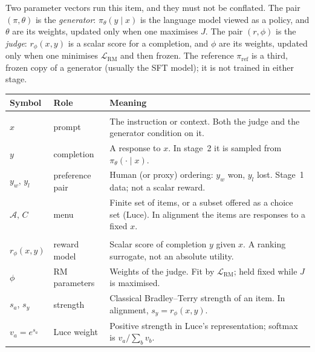 \documentclass[11pt,a4paper]{article}
\theoremstyle{definition}
\begin{document}
Two parameter vectors run this item, and they must not be conflated. The pair \((\pi,\theta)\) is the \emph{generator}: \(\pi_\theta(y\mid x)\) is the language model viewed as a policy, and \(\theta\) are its weights, updated only when one maximises \(J\). The pair \((r,\phi)\) is the \emph{judge}: \(r_\phi(x,y)\) is a scalar score for a completion, and \(\phi\) are its weights, updated only when one minimises \(\mathcal{L}_{\mathrm{RM}}\) and then frozen. The reference \(\pi_{\mathrm{ref}}\) is a third, frozen copy of a generator (usually the SFT model); it is not trained in either stage.

{\small
\setlength{\tabcolsep}{3.5pt}
\renewcommand{\arraystretch}{1.18}
\begin{center}
\begin{tabularx}{\linewidth}{|
  >{\raggedright\arraybackslash}p{2.35cm}|
  >{\raggedright\arraybackslash}p{2.15cm}|
  >{\raggedright\arraybackslash}X|
}
\hline
\textbf{Symbol} & \textbf{Role} & \textbf{Meaning} \\
\hline
\multicolumn{3}{|l|}{\textit{Data}} \\
\hline
\(x\) & prompt & The instruction or context. Both the judge and the generator condition on it. \\
\hline
\(y\) & completion & A response to \(x\). In stage~2 it is sampled from \(\pi_\theta(\cdot\mid x)\). \\
\hline
\(y_w,\,y_l\) & preference pair & Human (or proxy) ordering: \(y_w\) won, \(y_l\) lost. Stage~1 data; not a scalar reward. \\
\hline
\(\mathcal{A},\,C\) & menu & Finite set of items, or a subset offered as a choice set (Luce). In alignment the items are responses to a fixed \(x\). \\
\hline
\multicolumn{3}{|l|}{\textit{Judge \(r_\phi\) (stage~1 trains \(\phi\), then freezes it)}} \\
\hline
\(r_\phi(x,y)\) & reward model & Scalar score of completion \(y\) given \(x\). A ranking surrogate, not an absolute utility. \\
\hline
\(\phi\) & RM parameters & Weights of the judge. Fit by \(\mathcal{L}_{\mathrm{RM}}\); held fixed while \(J\) is maximised. \\
\hline
\(s_a\), \(s_y\) & strength & Classical Bradley--Terry strength of an item. In alignment, \(s_y=r_\phi(x,y)\). \\
\hline
\(v_a=e^{s_a}\) & Luce weight & Positive strength in Luce's representation; softmax is \(v_a/\sum_b v_b\). \\

\end{tabularx}
\end{center}}
\end{document}
